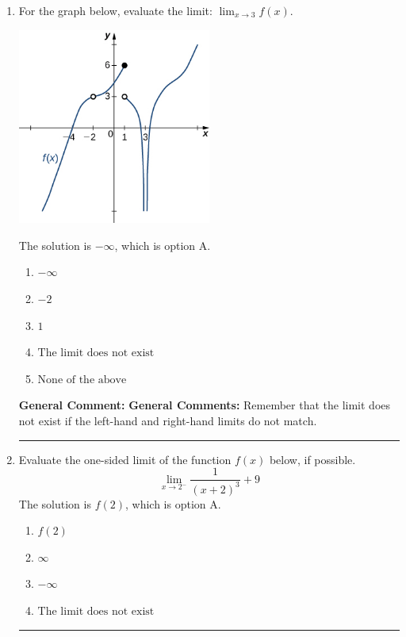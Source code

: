 \documentclass{extbook}[14pt]
\newcommand{\litem}[1]{\item #1

\rule{\textwidth}{0.4pt}}
\begin{document}
\begin{enumerate}\litem{
For the graph below, evaluate the limit: $ \displaystyle \lim_{x \rightarrow 3} f(x)$.

\begin{center}
    \includegraphics[width=0.5\textwidth]{../Figures/evaluateLimitGraphicallyA.png}
\end{center}


The solution is \( -\infty \), which is option A.\begin{enumerate}[label=\Alph*.]
\item \( -\infty \)


\item \( -2 \)


\item \( 1 \)


\item \( \text{The limit does not exist} \)


\item \( \text{None of the above} \)


\end{enumerate}

\textbf{General Comment:} \textbf{General Comments:} Remember that the limit does not exist if the left-hand and right-hand limits do not match.
}
\litem{
Evaluate the one-sided limit of the function $f(x)$ below, if possible.
\[ \lim_{x \rightarrow 2^-} \frac{1}{(x+2)^3}+9 \]The solution is \( f(2) \), which is option A.\begin{enumerate}[label=\Alph*.]
\item \( f(2) \)


\item \( \infty \)


\item \( -\infty \)


\item \( \text{The limit does not exist} \)



\end{enumerate}}
\end{enumerate}
\end{document}
